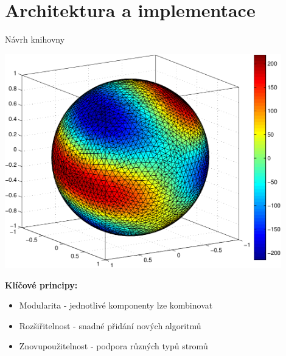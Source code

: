 \documentclass[lualatex,hyperref={pdfencoding=auto}]{beamer}
\begin{document}
\section{Architektura a implementace}
\begin{frame}{Návrh knihovny}
  \begin{center}
    \includegraphics[width=0.9\textwidth]{fig/sphere_mix_real.pdf}
  \end{center}
  \vspace{3mm}
  \textbf{Klíčové principy:}
  \begin{itemize}
    \item Modularita - jednotlivé komponenty lze kombinovat
    \item Rozšiřitelnost - snadné přidání nových algoritmů
    \item Znovupoužitelnost - podpora různých typů stromů
  \end{itemize}
\end{frame}
\end{document}
